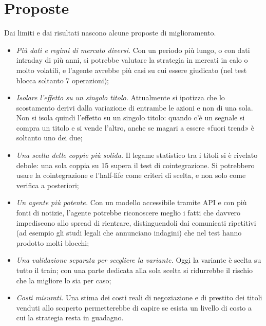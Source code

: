 \documentclass[11pt,a4paper]{article}
\begin{document}
\section{Proposte}
Dai limiti e dai risultati nascono alcune proposte di miglioramento.
\begin{itemize}
  \item \emph{Più dati e regimi di mercato diversi.} Con un periodo più lungo, o con dati intraday di più anni, si potrebbe valutare la strategia in mercati in calo o molto volatili, e l'agente avrebbe più casi su cui essere giudicato (nel test blocca soltanto 7 operazioni);
  \item \emph{Isolare l'effetto su un singolo titolo.} Attualmente si ipotizza che lo scostamento derivi dalla variazione di entrambe le azioni e non di una sola. Non si isola quindi l'effetto su un singolo titolo: quando c'è un segnale si compra un titolo e si vende l'altro, anche se magari a essere «fuori trend» è soltanto uno dei due;
  \item \emph{Una scelta delle coppie più solida.} Il legame statistico tra i titoli si è rivelato debole: una sola coppia su 15 supera il test di cointegrazione. Si potrebbero usare la cointegrazione e l'half-life come criteri di scelta, e non solo come verifica a posteriori;
  \item \emph{Un agente più potente.} Con un modello accessibile tramite API e con più fonti di notizie, l'agente potrebbe riconoscere meglio i fatti che davvero impediscono allo spread di rientrare, distinguendoli dai comunicati ripetitivi (ad esempio gli studi legali che annunciano indagini) che nel test hanno prodotto molti blocchi;
  \item \emph{Una validazione separata per scegliere la variante.} Oggi la variante è scelta su tutto il train; con una parte dedicata alla sola scelta si ridurrebbe il rischio che la migliore lo sia per caso;
  \item \emph{Costi misurati.} Una stima dei costi reali di negoziazione e di prestito dei titoli venduti allo scoperto permetterebbe di capire se esista un livello di costo a cui la strategia resta in guadagno.
\end{itemize}
\end{document}
